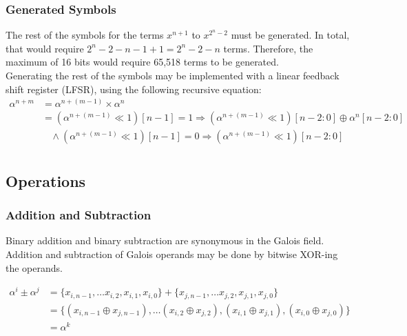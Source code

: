 \documentclass[paper=usletter, fontsize=12pt]{article}
\begin{document}
            \subsubsection{Generated Symbols}
            The rest of the symbols for the terms $x^{n+1}$ to $x^{2^{n}-2}$ must be generated. In total, that would require $2^{n}-2-n-1+1=2^{n}-2-n$ terms. Therefore, the maximum of 16 bits would require 65,518 terms to be generated. \\
            Generating the rest of the symbols may be implemented with a linear feedback shift register (LFSR), using the following recursive equation: \\

                \begin{equation*}
                    \begin{split}
                        \alpha^{n+m} & =\alpha^{n+(m-1)}\times \alpha^{n} \\
                        & = (\alpha^{n+(m-1)} \ll 1 )[n-1] = 1 \Longrightarrow ( \alpha^{n+(m-1)} \ll 1 )[n-2:0] \oplus \alpha^{n}[n-2:0] \\
                        & \ \ \ \ \wedge (\alpha^{n+(m-1)} \ll 1 )[n-1] = 0 \Longrightarrow ( \alpha^{n+(m-1)} \ll 1 )[n-2:0] \\
                    \end{split}
                \end{equation*}

            \newpage

        \subsection{Operations}

            \subsubsection{Addition and Subtraction}
            Binary addition and binary subtraction are synonymous in the Galois field. Addition and subtraction of Galois operands may be done by bitwise XOR-ing the operands.

                \begin{equation*}
                    \begin{split}
                        \alpha^{i} \pm \alpha^{j} & = \{x_{i, n-1},\ldots x_{i, 2},x_{i, 1},x_{i, 0}\} + \{x_{j, n-1}, \ldots x_{j, 2}, x_{j, 1}, x_{j, 0}\} \\
                        & = \{(x_{i, n-1} \oplus x_{j,n-1}), \ldots (x_{i, 2}\oplus x_{j, 2}), (x_{i, 1}\oplus x_{j, 1}), (x_{i, 0}\oplus x_{j, 0})\} \\
                        & = \alpha^{k}
                    \end{split}
                \end{equation*}
\end{document}
